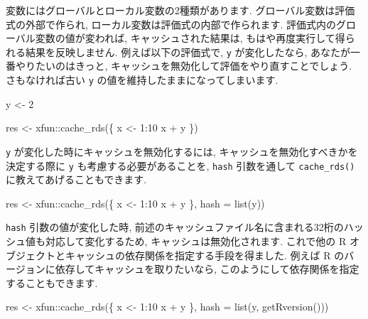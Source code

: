 \documentclass[
  11pt,
]{bxjsreport}
\newenvironment{Shaded}{\begin{snugshade}}{\end{snugshade}}
\newcommand{\AttributeTok}[1]{\textcolor[rgb]{0.77,0.63,0.00}{#1}}
\newcommand{\DecValTok}[1]{\textcolor[rgb]{0.00,0.00,0.81}{#1}}
\newcommand{\FunctionTok}[1]{\textcolor[rgb]{0.00,0.00,0.00}{#1}}
\newcommand{\NormalTok}[1]{#1}
\newcommand{\OtherTok}[1]{\textcolor[rgb]{0.56,0.35,0.01}{#1}}
\newcommand{\SpecialCharTok}[1]{\textcolor[rgb]{0.00,0.00,0.00}{#1}}
\begin{document}
変数にはグローバルとローカル変数の2種類があります. グローバル変数は評価式の外部で作られ, ローカル変数は評価式の内部で作られます. 評価式内のグローバル変数の値が変われば, キャッシュされた結果は, もはや再度実行して得られる結果を反映しません. 例えば以下の評価式で, \texttt{y} が変化したなら, あなたが一番やりたいのはきっと, キャッシュを無効化して評価をやり直すことでしょう. さもなければ古い \texttt{y} の値を維持したままになってしまいます.

\begin{Shaded}
\begin{Highlighting}[]
\NormalTok{y }\OtherTok{\textless{}{-}} \DecValTok{2}

\NormalTok{res }\OtherTok{\textless{}{-}}\NormalTok{ xfun}\SpecialCharTok{::}\FunctionTok{cache\_rds}\NormalTok{(\{}
\NormalTok{  x }\OtherTok{\textless{}{-}} \DecValTok{1}\SpecialCharTok{:}\DecValTok{10}
\NormalTok{  x }\SpecialCharTok{+}\NormalTok{ y}
\NormalTok{\})}
\end{Highlighting}
\end{Shaded}

\texttt{y} が変化した時にキャッシュを無効化するには, キャッシュを無効化すべきかを決定する際に \texttt{y} も考慮する必要があることを, \texttt{hash} 引数を通して \texttt{cache\_rds()} に教えてあげることもできます.

\begin{Shaded}
\begin{Highlighting}[]
\NormalTok{res }\OtherTok{\textless{}{-}}\NormalTok{ xfun}\SpecialCharTok{::}\FunctionTok{cache\_rds}\NormalTok{(\{}
\NormalTok{  x }\OtherTok{\textless{}{-}} \DecValTok{1}\SpecialCharTok{:}\DecValTok{10}
\NormalTok{  x }\SpecialCharTok{+}\NormalTok{ y}
\NormalTok{\}, }\AttributeTok{hash =} \FunctionTok{list}\NormalTok{(y))}
\end{Highlighting}
\end{Shaded}

\texttt{hash} 引数の値が変化した時, 前述のキャッシュファイル名に含まれる32桁のハッシュ値も対応して変化するため, キャッシュは無効化されます. これで他の R オブジェクトとキャッシュの依存関係を指定する手段を得ました. 例えば R のバージョンに依存してキャッシュを取りたいなら, このようにして依存関係を指定することもできます.

\begin{Shaded}
\begin{Highlighting}[]
\NormalTok{res }\OtherTok{\textless{}{-}}\NormalTok{ xfun}\SpecialCharTok{::}\FunctionTok{cache\_rds}\NormalTok{(\{}
\NormalTok{  x }\OtherTok{\textless{}{-}} \DecValTok{1}\SpecialCharTok{:}\DecValTok{10}
\NormalTok{  x }\SpecialCharTok{+}\NormalTok{ y}
\NormalTok{\}, }\AttributeTok{hash =} \FunctionTok{list}\NormalTok{(y, }\FunctionTok{getRversion}\NormalTok{()))}
\end{Highlighting}
\end{Shaded}
\end{document}
